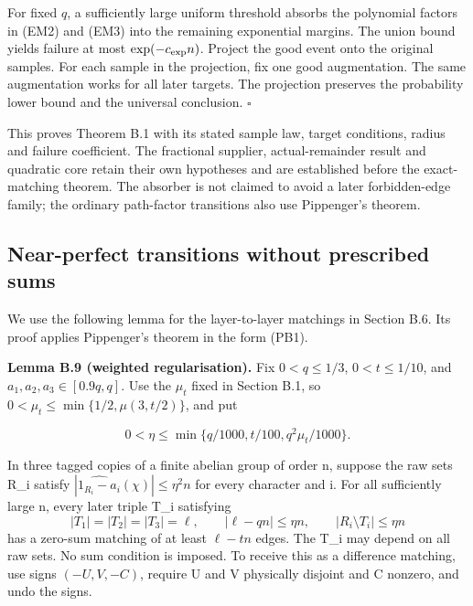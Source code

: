 \documentclass[11pt,a4paper]{article}
\newcommand{\statementstart}{\par\addvspace{6pt plus 1pt minus 1pt}\noindent}
\begin{document}
For fixed \(q\), a sufficiently large uniform threshold absorbs the polynomial factors in (EM2) and (EM3) into the remaining exponential margins. The union bound yields failure at most \(\exp(-c_{\rm exp} n)\). Project the good event onto the original samples. For each sample in the projection, fix one good augmentation. The same augmentation works for all later targets. The projection preserves the probability lower bound and the universal conclusion. \(\square\)

This proves Theorem B.1 with its stated sample law, target conditions, radius and failure coefficient. The fractional supplier, actual-remainder result and quadratic core retain their own hypotheses and are established before the exact-matching theorem. The absorber is not claimed to avoid a later forbidden-edge family; the ordinary path-factor transitions also use Pippenger's theorem.

\hypertarget{near-perfect-transitions-without-prescribed-sums}{%
\subsection{Near-perfect transitions without prescribed sums}\label{near-perfect-transitions-without-prescribed-sums}}

We use the following lemma for the layer-to-layer matchings in Section B.6. Its proof applies Pippenger's theorem in the form (PB1).

\statementstart\textbf{Lemma B.9 (weighted regularisation).} Fix \(0<q\le 1/3\), \(0<t\le 1/10\), and \(a_1,a_2,a_3 \in [0.9q,q]\). Use the \(\mu_t\) fixed in Section B.1, so \(0<\mu_t\le \min\{1/2,\mu(3,t/2)\}\), and put

\begin{equation}
0<\eta\le\min\{q/1000,t/100,q^2\mu_t/1000\}.
\tag{J1}\label{eq:J1}
\end{equation}

In three tagged copies of a finite abelian group of order n, suppose the raw sets R\_i satisfy \(|\widehat{1_{R_i}-a_i}(\chi)|\le \eta^2 n\) for every character and i. For all sufficiently large n, every later triple T\_i satisfying \begin{equation}
|T_1|=|T_2|=|T_3|=\ell,\qquad
|\ell-qn|\le\eta n,\qquad |R_i\setminus T_i|\le\eta n
\tag{J2}\label{eq:J2}
\end{equation} has a zero-sum matching of at least \(\ell-tn\) edges. The T\_i may depend on all raw sets. No sum condition is imposed. To receive this as a difference matching, use signs \((-U,V,-C)\), require U and V physically disjoint and C nonzero, and undo the signs.
\end{document}
